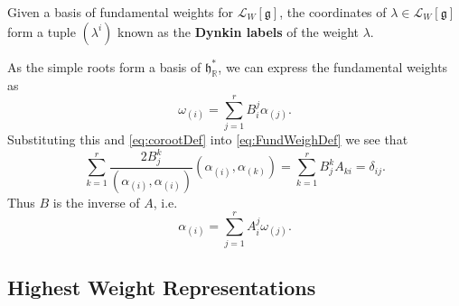 \documentclass[11pt,fleqn]{article}
\begin{document}
\begin{definition}
	Given a basis of fundamental weights for $\mathcal{L}_W[\mathfrak{g}]$, the coordinates of $\lambda \in \mathcal{L}_W[\mathfrak{g}]$ form a tuple $(\lambda^i)$ known as the \textbf{Dynkin labels} of the weight $\lambda$.
\end{definition}

\begin{remark}
	As the simple roots form a basis of $\mathfrak{h}^*_\mathbb{R}$, we can express the fundamental weights as
		\begin{equation}
			\omega_{(i)} = \sum_{j=1}^r B_i^j \alpha_{(j)}.
		\end{equation}
	Substituting this and \eqref{eq:corootDef} into \eqref{eq:FundWeighDef} we see that
		\begin{equation} 
			\sum_{k=1}^r \frac{2 B^k_j}{(\alpha_{(i)}, \alpha_{(i)})} (\alpha_{(i)}, \alpha_{(k)}) = \sum_{k=1}^r B^k_j A_{ki} = \delta_{ij}.
		\end{equation}
	Thus $B$ is the inverse of $A$, i.e.
		\begin{equation}
			\alpha_{(i)} = \sum_{j=1}^r A_i^j \omega_{(j)}.
		\end{equation}
\end{remark}

\subsection{Highest Weight Representations}
\end{document}
